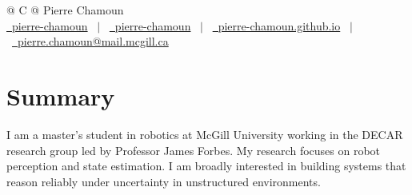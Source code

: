\documentclass[letter,10pt]{article}
\begin{document}
\pagestyle{empty} 



\begin{tabularx}{\linewidth}{@{} C @{}}
\Huge{Pierre Chamoun} \\[7.5pt]
\href{https://github.com/pierre-chamoun}{\raisebox{-0.05\height}\faGithub\ pierre-chamoun} \ $|$ \ 
\href{https://linkedin.com/in/pierre-chamoun}{\raisebox{-0.05\height}\faLinkedin\ pierre-chamoun} \ $|$ \ 
\href{https://pierre-chamoun.github.io}{\raisebox{-0.05\height}\faGlobe \ pierre-chamoun.github.io} \ $|$ \ 
\href{mailto:pierre.chamoun@mail.mcgill.ca}{\raisebox{-0.05\height}\faEnvelope \ pierre.chamoun@mail.mcgill.ca} \ %
\end{tabularx}

\section{Summary}
I am a master's student in robotics at McGill University working in the DECAR research group led by Professor James Forbes. My research focuses on robot perception and state estimation. I am broadly interested in building systems that reason reliably under uncertainty in unstructured environments.

\end{document}
